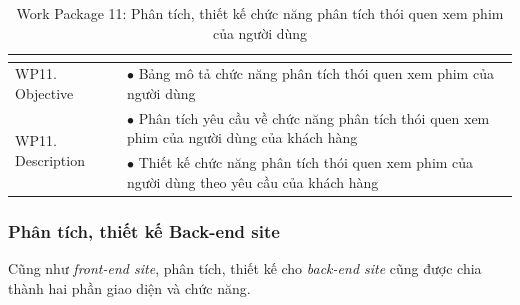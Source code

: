 \documentclass[a4paper]{book}
\begin{document}
\begin{table}[h!]
	\begin{center}
		\begin{tabular}{|p{4cm}|p{10cm}|}
			\hline
			\multicolumn{2}{|c|}{\cellcolor[HTML]{363636}{\color[HTML]{FFFFFF}Work package 11: Phân tích, thiết kế chức năng phân tích thói quen người dùng}}\\
			\hline
			\multirow{1}{*}{WP11. Objective} & $\bullet$ Bảng mô tả chức năng phân tích thói quen xem phim của người dùng\\
			\hline
			\multirow{2}{*}{WP11. Description} & $\bullet$ Phân tích yêu cầu về chức năng phân tích thói quen xem phim của người dùng của khách hàng \\
			& $\bullet$ Thiết kế chức năng phân tích thói quen xem phim của người dùng theo yêu cầu của khách hàng\\
			\hline
		\end{tabular}
		\caption{Work Package 11: Phân tích, thiết kế chức năng phân tích thói quen xem phim của người dùng}
		\label{table:frontend_thietke_chucnang_thoiquen}
	\end{center}
\end{table}
\subsubsection{Phân tích, thiết kế Back-end site}
Cũng như \textit{front-end site}, phân tích, thiết kế cho \textit{back-end site} cũng được chia thành hai phần giao diện và chức năng.
\end{document}
